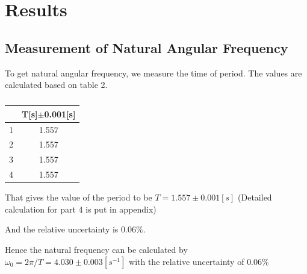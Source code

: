 \documentclass[12pt,a4paper]{article}
\begin{document}
\section{Results}
\subsection{Measurement of Natural Angular Frequency}
\qquad To get natural angular frequency, we measure the time of period. The values are calculated based on table 2.
\begin{table}[h]
    \centering
    
    \begin{tabular}{|c|c|}
    \hline
     & T[s]$\pm$0.001[s]     \\ \hline
    1            & 1.557 \\
    2            & 1.557 \\
    3            & 1.557 \\
    4            & 1.557 \\
    \hline
    \end{tabular}
    \captionsetup[table]{labelsep=space}
    \caption{}
\end{table}
\par That gives the value of the period to be $T=1.557\pm 0.001[s]$ (Detailed calculation for part 4 is put in appendix)
\par And the relative uncertainty is $0.06\%$.
\par Hence the natural frequency can be calculated by $\omega_0=2\pi/T=4.030\pm 0.003[s^{-1}]$ with the 
relative uncertainty of $0.06\%$
\end{document}
